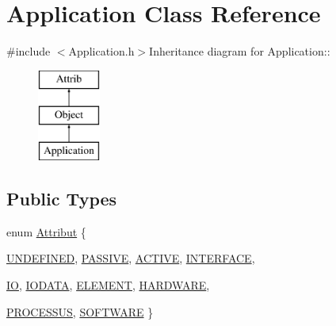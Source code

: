 \hypertarget{classApplication}{
\section{Application Class Reference}
\label{classApplication}
}


{\ttfamily \#include $<$Application.h$>$}Inheritance diagram for Application::\begin{figure}[H]
\begin{center}
\leavevmode
\includegraphics[height=3cm]{classApplication}
\end{center}
\end{figure}
\subsection*{Public Types}
\begin{DoxyCompactItemize}
\item 
enum \hyperlink{classAttrib_a69e171d7cc6417835a5a306d3c764235}{Attribut} \{ \par
\hyperlink{classAttrib_a69e171d7cc6417835a5a306d3c764235a3a8da2ab97dda18aebab196fe4100531}{UNDEFINED}, 
\hyperlink{classAttrib_a69e171d7cc6417835a5a306d3c764235a2bfb2af57b87031d190a05fe25dd92ed}{PASSIVE}, 
\hyperlink{classAttrib_a69e171d7cc6417835a5a306d3c764235a3b1fec929c0370d1436f2f06e298fb0d}{ACTIVE}, 
\hyperlink{classAttrib_a69e171d7cc6417835a5a306d3c764235aa27c16b480a369ea4d18b07b2516bbc7}{INTERFACE}, 
\par
\hyperlink{classAttrib_a69e171d7cc6417835a5a306d3c764235a1420a5b8c0540b2af210b6975eded7f9}{IO}, 
\hyperlink{classAttrib_a69e171d7cc6417835a5a306d3c764235a0af3b0d0ac323c1704e6c69cf90add28}{IODATA}, 
\hyperlink{classAttrib_a69e171d7cc6417835a5a306d3c764235a7788bc5dd333fd8ce18562b269c9dab1}{ELEMENT}, 
\hyperlink{classAttrib_a69e171d7cc6417835a5a306d3c764235a61ceb22149f365f1780d18f9d1459423}{HARDWARE}, 
\par
\hyperlink{classAttrib_a69e171d7cc6417835a5a306d3c764235a75250e29692496e73effca2c0330977f}{PROCESSUS}, 
\hyperlink{classAttrib_a69e171d7cc6417835a5a306d3c764235a103a67cd0b8f07ef478fa45d4356e27b}{SOFTWARE}
 \}
\end{DoxyCompactItemize}

